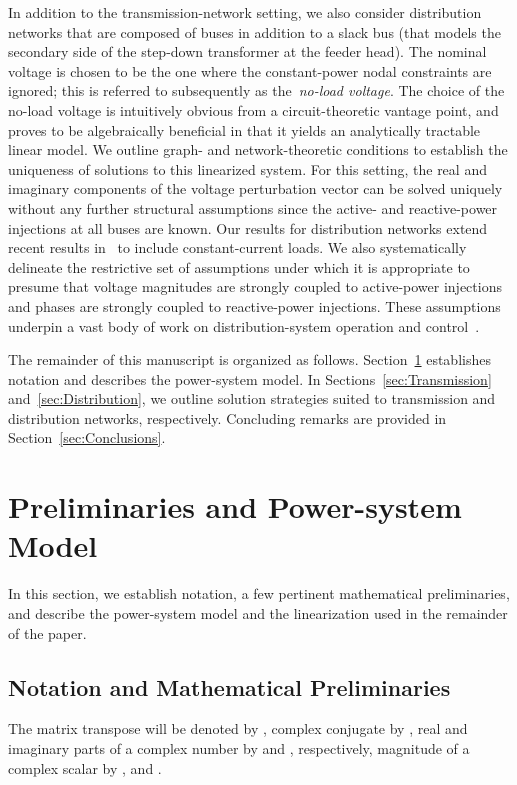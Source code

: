 \documentclass[10 pt, conference]{ieeeconf}
\begin{document}
In addition to the transmission-network setting, we also consider distribution networks that are composed of  buses in addition to a slack bus (that models the secondary side of the step-down transformer at the feeder head). The nominal voltage is chosen to be the one where the constant-power nodal constraints are ignored; this is referred to subsequently as the~\emph{no-load voltage}. The choice of the no-load voltage is intuitively obvious from a circuit-theoretic vantage point, and proves to be algebraically beneficial in that it yields an analytically tractable linear model. We outline graph- and network-theoretic conditions to establish the uniqueness of solutions to this linearized system. For this setting, the real and imaginary components of the voltage perturbation vector can be solved uniquely without any further structural assumptions since the active- and reactive-power injections at all buses are known. Our results for distribution networks extend recent results in~\cite{Bolognani-2015} to include constant-current loads. We also systematically delineate the restrictive set of assumptions under which it is appropriate to presume that voltage magnitudes are strongly coupled to active-power injections and phases are strongly coupled to reactive-power injections. These assumptions underpin a vast body of work on distribution-system operation and control~\cite{Robbins-2013,Zhong-2013,Emiliano-2015}. 
 
The remainder of this manuscript is organized as follows. Section~\ref{sec:Prelim} establishes notation and describes the power-system model. In Sections~\ref{sec:Transmission} and~\ref{sec:Distribution}, we outline solution strategies suited to transmission and distribution networks, respectively. Concluding remarks are provided in Section~\ref{sec:Conclusions}.

\section{Preliminaries and Power-system Model}
\label{sec:Prelim}

In this section, we establish notation, a few pertinent mathematical preliminaries, and describe the power-system model and the linearization used in the remainder of the paper. 

\subsection{Notation and Mathematical Preliminaries}
The matrix transpose will be denoted by , complex conjugate by , real and imaginary parts of a complex number by  and , respectively, magnitude of a complex scalar by , and . 
\end{document}
